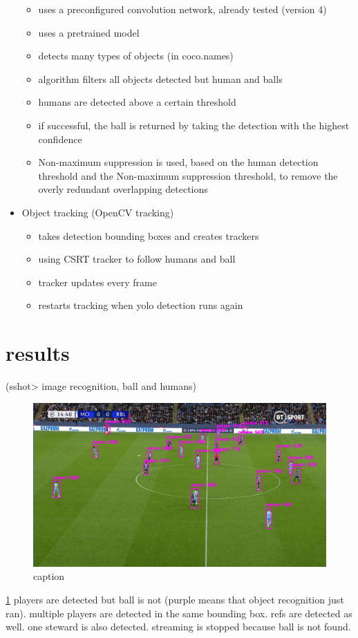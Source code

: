 \documentclass[
11pt,
twoside
]{report}
\begin{document}
\begin{itemize}
  \begin{itemize}
  \item
    uses a preconfigured convolution network, already tested (version 4)
  \item
    uses a pretrained model
  \item
    detects many types of objects (in coco.names)
  \item
    algorithm filters all objects detected but human and balls
  \item
    humans are detected above a certain threshold
  \item
    if successful, the ball is returned by taking the detection with the
    highest confidence
  \item
    Non-maximum suppression is used, based on the human detection
    threshold and the Non-maximum suppression threshold, to remove the
    overly redundant overlapping detections
  \end{itemize}
\item
  Object tracking (OpenCV tracking)

  \begin{itemize}
  \item
    takes detection bounding boxes and creates trackers
  \item
    using CSRT tracker to follow humans and ball
  \item
    tracker updates every frame
  \item
    restarts tracking when yolo detection runs again
  \end{itemize}
\end{itemize}



\section{results}

\listoffigures

(sshot\textgreater{} image recognition, ball and humans)


\begin{figure}[H]
    \includegraphics[keepaspectratio, width=\columnwidth]{first.png}
    \caption{caption}
    \label{img:1}
\end{figure}
\ref{img:1}
players are detected but ball is not (purple means that object recognition just ran). multiple players are detected in the same bounding box. refs are detected as well. one steward is also detected. streaming is stopped because ball is not found.
\end{document}
